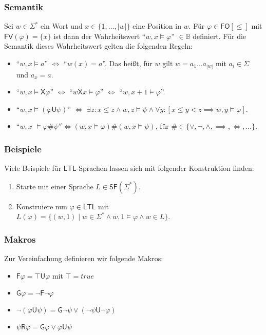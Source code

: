 \documentclass[12pt, german]{article}
\newcommand{\B}{\mathbb{B}}
\newcommand{\sigstern}{\Sigma^\ast}
\newcommand{\starfree}{\mathsf{SF}}
\newcommand{\sast}{\Sigma^{\ast}}
\newcommand{\fv}{\mathsf{FV}}
\newcommand{\fo}{\mathsf{FO}}
\newcommand{\ltl}{\mathsf{LTL}}
\newcommand{\sX}{\mathsf{X}}
\newcommand{\sF}{\mathsf{F}}
\newcommand{\sG}{\mathsf{G}}
\newcommand{\sU}{\mathsf{U}}
\newcommand{\sR}{\mathsf{R}}
\begin{document}
\subsubsection{Semantik}
	Sei $w \in \sast$ ein Wort und $x \in\{1, \ldots, |w|\}$ eine Position in $w$.
	Für $\varphi \in \fo[\leq]$ mit $\fv(\varphi) = \{x\}$ ist dann der Wahrheitswert ``$w,x \models \varphi$'' $\in \B$ definiert.
	Für die Semantik dieses Wahrheitswert gelten die folgenden Regeln:
	\begin{itemize}
		\item ``$w,x \models a$'' $\iff$ ``$w(x) = a$''. Das hei\ss t, für $w$ gilt $w = a_1 \ldots a_{|w|}$ mit $a_i\in \Sigma$ und $a_x = a$.
		\item ``$w,x \models \sX \varphi$'' $\iff$ ``$w\sX x \models \varphi$'' $\iff$ ``$w, x+1 \models \varphi$''.
		\item ``$w, x \models (\varphi \sU \psi)$'' $\iff$ $\exists z : x \leq z \land w, z \models \psi \land \forall y: [x \leq y < z \implies w, y \models \varphi]$.
		\item ``$w,x$ $\models \varphi \#\psi'' \iff (w,x \models \varphi) \# (w,x \models \psi )$, für $\# \in \{\lor, \neg, \land, \implies, \iff, \ldots\}$.
	\end{itemize}

\subsubsection{Beispiele}
	Viele Beispiele für $\ltl$-Sprachen lassen sich mit folgender Konstruktion finden:
		\begin{enumerate}[label=\arabic*.)]
			\item Starte mit einer Sprache $L \in \starfree(\sigstern)$.
			\item Konstruiere nun $\varphi \in \ltl$ mit $L(\varphi) = \{(w,1) \mid w \in \sigstern \land w,1 \models \varphi \land w \in L\}$.
		\end{enumerate}
\subsubsection{Makros}
	Zur Vereinfachung definieren wir folgende Makros:
\begin{multicols}{2}
		\begin{itemize}
		\item $\sF \varphi = \top \sU \varphi$ mit $\top = true$
		\item $\sG \varphi = \neg \sF \neg \varphi$
		\item $\neg(\varphi \sU \psi) = \sG \neg \psi \lor (\neg \psi \sU \neg \varphi)$
		\item $\psi \sR \varphi = \sG \varphi \lor \varphi \sU \psi$
	\end{itemize}
\end{multicols}
	
\end{document}
